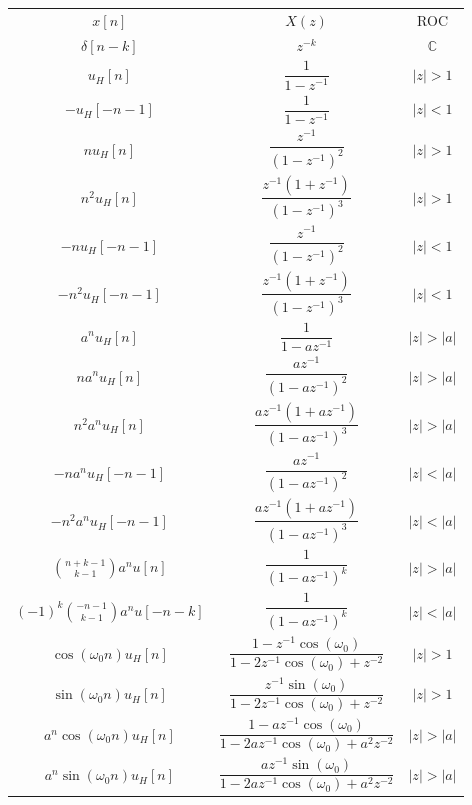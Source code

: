 \documentclass[11pt]{article}
\begin{document}
  \bgroup
  \renewcommand{\arraystretch}{2}
  \setlength{\tabcolsep}{1cm}
  \large\begin{tabular}{c|c|c}
    \(x[n]\) & \(X(z)\) & ROC \\
    \(\delta[n - k]\) & \(z^{-k}\) & \(\mathbb{C}\) \\
    \(u_H[n]\) & \(\dfrac{1}{1 - z^{-1}}\) & \(|z| > 1\) \\
    \(-u_H[-n - 1]\) & \(\dfrac{1}{1 - z^{-1}}\) & \(|z| < 1\) \\
    \(nu_H[n]\) & \(\dfrac{z^{-1}}{(1 - z^{-1})^2}\) & \(|z| > 1\) \\
    \(n^2u_H[n]\) & \(\dfrac{z^{-1}(1 + z^{-1})}{(1 - z^{-1})^3}\) & \(|z| > 1\) \\
    \(-nu_H[-n - 1]\) & \(\dfrac{z^{-1}}{(1 - z^{-1})^2}\) & \(|z| < 1\) \\
    \(-n^2u_H[-n - 1]\) & \(\dfrac{z^{-1}(1 + z^{-1})}{(1 - z^{-1})^3}\) & \(|z| < 1\) \\
    \(a^n u_H[n]\) & \(\dfrac{1}{1 - az^{-1}}\) & \(|z| > |a|\) \\
    \(na^n u_H[n]\) & \(\dfrac{az^{-1}}{(1 - az^{-1})^2}\) & \(|z| > |a|\) \\
    \(n^2a^n u_H[n]\) & \(\dfrac{az^{-1}(1 + az^{-1})}{(1 - az^{-1})^3}\) & \(|z| > |a|\) \\
    \(-na^n u_H[-n - 1]\) & \(\dfrac{az^{-1}}{(1 - az^{-1})^2}\) & \(|z| < |a|\) \\
    \(-n^2a^n u_H[-n - 1]\) & \(\dfrac{az^{-1}(1 + az^{-1})}{(1 - az^{-1})^3}\) & \(|z| < |a|\) \\
    \(\binom{n + k - 1}{k - 1}a^n u[n]\) & \(\dfrac{1}{(1 - az^{-1})^k}\) & \(|z| > |a|\) \\
    \((-1)^k\binom{-n - 1}{k - 1}a^n u[-n - k]\) & \(\dfrac{1}{(1 - az^{-1})^k}\) & \(|z| < |a|\) \\
    \(\cos(\omega_0 n)u_H[n]\) & \(\dfrac{1 - z^{-1}\cos(\omega_0)}{1 - 2z^{-1}\cos(\omega_0) + z^{-2}}\) & \(|z| > 1\) \\
    \(\sin(\omega_0 n)u_H[n]\) & \(\dfrac{z^{-1}\sin(\omega_0)}{1 - 2z^{-1}\cos(\omega_0) + z^{-2}}\) & \(|z| > 1\) \\
    \(a^n\cos(\omega_0 n)u_H[n]\) & \(\dfrac{1 - az^{-1}\cos(\omega_0)}{1 - 2az^{-1}\cos(\omega_0) + a^2z^{-2}}\) & \(|z| > |a|\) \\
    \(a^n\sin(\omega_0 n)u_H[n]\) & \(\dfrac{az^{-1}\sin(\omega_0)}{1 - 2az^{-1}\cos(\omega_0) + a^2z^{-2}}\) & \(|z| > |a|\)
  \end{tabular}
  \egroup
\end{document}
